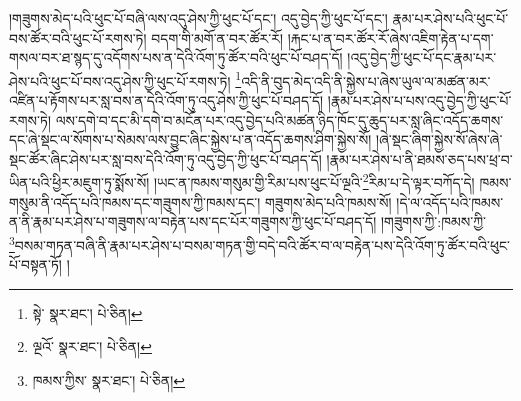།གཟུགས་མེད་པའི་ཕུང་པོ་བཞི་ལས་འདུ་ཤེས་ཀྱི་ཕུང་པོ་དང་། འདུ་བྱེད་ཀྱི་ཕུང་པོ་དང་། རྣམ་པར་ཤེས་པའི་ཕུང་པོ་བས་ཚོར་བའི་ཕུང་པོ་རགས་ཏེ། བདག་གི་མགོ་ན་བར་ཚོར་རོ། །རྐང་པ་ན་བར་ཚོར་རོ་ཞེས་འཇིག་རྟེན་པ་དག་གསལ་བར་ཐ་སྙད་དུ་འདོགས་པས་ན་དེའི་འོག་ཏུ་ཚོར་བའི་ཕུང་པོ་བཤད་དོ། །འདུ་བྱེད་ཀྱི་ཕུང་པོ་དང་རྣམ་པར་ཤེས་པའི་ཕུང་པོ་བས་འདུ་ཤེས་ཀྱི་ཕུང་པོ་རགས་ཏེ། \footnote{སྟེ་  སྣར་ཐང་།  པེ་ཅིན། }འདི་ནི་བུད་མེད་འདི་ནི་སྐྱེས་པ་ཞེས་ཡུལ་ལ་མཚན་མར་འཛིན་པ་རྟོགས་པར་སླ་བས་ན་དེའི་འོག་ཏུ་འདུ་ཤེས་ཀྱི་ཕུང་པོ་བཤད་དོ། །རྣམ་པར་ཤེས་པ་པས་འདུ་བྱེད་ཀྱི་ཕུང་པོ་རགས་ཏེ། ལས་དགེ་བ་དང་མི་དགེ་བ་མངོན་པར་འདུ་བྱེད་པའི་མཚན་ཉིད་ཁོང་དུ་ཆུད་པར་སླ་ཞིང་འདོད་ཆགས་དང་ཞེ་སྡང་ལ་སོགས་པ་སེམས་ལས་བྱུང་ཞིང་སྐྱེས་པ་ན་འདོད་ཆགས་ཤིག་སྐྱེས་སོ། །ཞེ་སྡང་ཞིག་སྐྱེས་སོ་ཞེས་ཞེ་སྡང་ཚོར་ཞིང་ཤེས་པར་སླ་བས་དེའི་འོག་ཏུ་འདུ་བྱེད་ཀྱི་ཕུང་པོ་བཤད་དོ། །རྣམ་པར་ཤེས་པ་ནི་ཐམས་ཅད་པས་ཕྲ་བ་ཡིན་པའི་ཕྱིར་མཇུག་ཏུ་སྨོས་སོ། །ཡང་ན་ཁམས་གསུམ་གྱི་རིམ་པས་ཕུང་པོ་ལྔའི་\footnote{ལྔའོ་  སྣར་ཐང་།  པེ་ཅིན། }རིམ་པ་དེ་ལྟར་བཀོད་དེ། ཁམས་གསུམ་ནི་འདོད་པའི་ཁམས་དང་གཟུགས་ཀྱི་ཁམས་དང་། གཟུགས་མེད་པའི་ཁམས་སོ། །དེ་ལ་འདོད་པའི་ཁམས་ན་ནི་རྣམ་པར་ཤེས་པ་གཟུགས་ལ་བརྟེན་པས་དང་པོར་གཟུགས་ཀྱི་ཕུང་པོ་བཤད་དོ། །གཟུགས་ཀྱི་:ཁམས་ཀྱི་\footnote{ཁམས་ཀྱིས་  སྣར་ཐང་།  པེ་ཅིན། }བསམ་གཏན་བཞི་ནི་རྣམ་པར་ཤེས་པ་བསམ་གཏན་གྱི་བདེ་བའི་ཚོར་བ་ལ་བརྟེན་པས་དེའི་འོག་ཏུ་ཚོར་བའི་ཕུང་པོ་བསྟན་ཏོ། །
